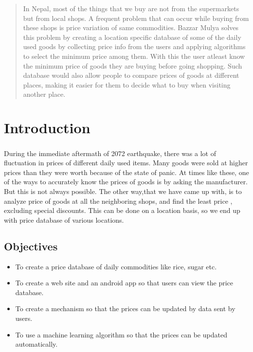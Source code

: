 \documentclass[12ptpt,a4paper]{article}
\begin{document}
	\begin{abstract}
In Nepal, most of the things that we buy are not from the supermarkets but from local shops. A frequent problem that can occur while buying from these shops is price variation of same commodities. Bazzar Mulya solves this problem by creating a location specific database of some of the daily used goods by collecting price info from the users and applying algorithms to select the minimum price among them. With this the user atleast know the minimum price of goods they are buying before going shopping. Such database would also allow people to compare prices of goods at different places, making it easier for them to decide what to buy when visiting another place.
	\end{abstract}
	\newpage
	\tableofcontents
	\newpage	
	\section{Introduction}
	\subparagraph{} During the immediate aftermath of 2072 earthquake, there was a lot of fluctuation in prices of different daily used items. Many goods were sold at higher prices than they were worth because of the state of panic. At times like these, one of the ways to accurately know the prices of goods is by asking the manufacturer. But this is not always possible. The other way,that we have came up with, is to analyze price of goods at all the neighboring shops, and find the least price , excluding special discounts. This can be done on a location basis, so we end up with price database of various locations.
		\subsection{Objectives}
		\begin{itemize}
			\item To create a price database of daily commodities like rice, sugar etc.
			\item To create a web site and an android app so that users can view the price database. 
			\item To create a mechanism so that the prices can be updated by data sent by users.
			\item To use a machine learning algorithm so that the prices can be updated automatically.
		\end{itemize}
\end{document}
